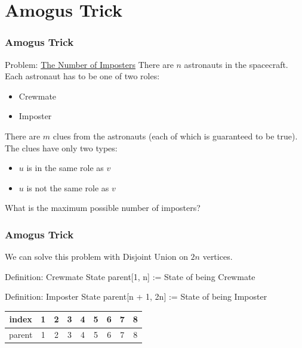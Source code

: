 \section{Amogus Trick}

\begin{frame}
\frametitle{Amogus Trick}

\begin{block}{Problem: \href{https://codeforces.com/contest/1594/problem/D}{The Number of Imposters}}
    There are $n$ astronauts in the spacecraft. Each astronaut has to be one of two roles:
    \begin{itemize}
        \item Crewmate
        \item Imposter
    \end{itemize}
    There are $m$ clues from the astronauts (each of which is guaranteed to be true). The clues have only two types:
    \begin{itemize}
        \item $u$ is in the same role as $v$
        \item $u$ is not the same role as $v$
    \end{itemize}
    What is the maximum possible number of imposters?
\end{block}

\end{frame}

\begin{frame}
\frametitle{Amogus Trick}

We can solve this problem with Disjoint Union on $2n$ vertices.

\begin{block}{Definition: Crewmate State}
    parent[1, n] := State of being Crewmate
\end{block}

\begin{block}{Definition: Imposter State}
    parent[n + 1, 2n] := State of being Imposter
\end{block}

\begin{center}
\begin{tabular}{|c||c|c|c|c|c|c|c|c|}
    \hline
    index & 1 & 2 & 3 & 4 & 5 & 6 & 7 & 8\\
    \hline
    \hline
    parent & 1 & 2 & 3 & 4 & 5 & 6 & 7 & 8\\
    \hline
\end{tabular}
\end{center}

\end{frame}

